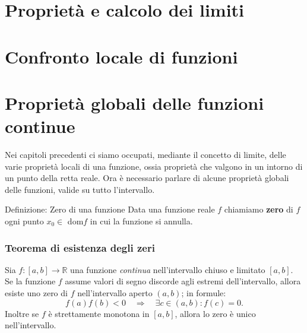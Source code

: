 \documentclass[x11names]{article}
\begin{document}
\newpage
\section{Proprietà e calcolo dei limiti}


\newpage
\section{Confronto locale di funzioni}


\newpage
\section{Proprietà globali delle funzioni continue}
Nei capitoli precedenti ci siamo occupati, mediante il concetto di limite, delle varie proprietà locali di una funzione, ossia proprietà che valgono in un intorno di un punto della retta reale. Ora è necessario parlare di alcune proprietà globali delle funzioni, valide su tutto l'intervallo.

\begin{center}
\colorbox{Azure2}{\begin{minipage}{5.75in}
\begin{blues}{Definizione: Zero di una funzione}
Data una funzione reale $f$ chiamiamo \textbf{zero} di $f$ ogni punto $x_0 \in$ dom$f$ in cui la funzione si annulla.
\end{blues}
\end{minipage}}        
\end{center}
\subsubsection{Teorema di esistenza degli zeri}
Sia $f:\left[a,b\right] \rightarrow \mathbb{R}$ una funzione \textit{continua} nell'intervallo chiuso e limitato $\left[a,b\right]$. Se la funzione $f$ assume valori di segno discorde agli estremi dell'intervallo, allora esiste uno zero  di $f$ nell'intervallo aperto $\left(a,b\right)$; in formule:
\[
	f\left(a\right)f\left(b\right) < 0 \quad \Rightarrow \quad \exists c \in \left(a,b\right) : f\left(c\right) = 0
.\] 
Inoltre se $f$ è strettamente monotona in $\left[a,b\right]$, allora lo zero è unico nell'intervallo.
\vspace{3cm}
\begin{center}

\end{center}
\end{document}
